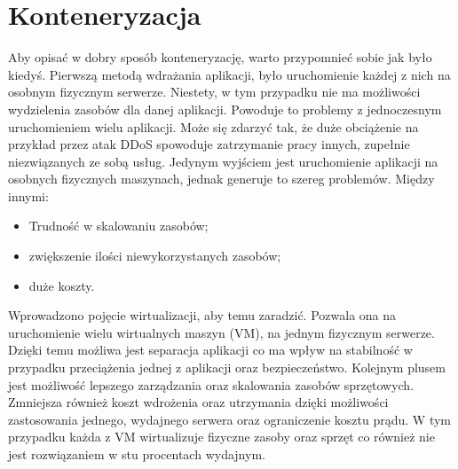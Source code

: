 \documentclass[pl,final,oneside]{mgr} %
\begin{document}
\section{Konteneryzacja}
Aby opisać w dobry sposób konteneryzację, warto przypomnieć sobie jak było kiedyś. Pierwszą metodą wdrażania aplikacji, było uruchomienie każdej z nich na osobnym fizycznym serwerze. Niestety, w tym przypadku nie ma możliwości wydzielenia zasobów dla danej aplikacji. Powoduje to problemy z jednoczesnym uruchomieniem wielu aplikacji. Może się zdarzyć tak, że duże obciążenie na przykład przez atak DDoS spowoduje zatrzymanie pracy innych, zupełnie niezwiązanych ze sobą usług. Jedynym wyjściem jest uruchomienie aplikacji na osobnych fizycznych maszynach, jednak generuje to szereg problemów. Między innymi:
\begin{itemize}
	\item Trudność w skalowaniu zasobów;
	\item zwiększenie ilości niewykorzystanych zasobów;
	\item duże koszty.
\end{itemize}
Wprowadzono pojęcie wirtualizacji, aby temu zaradzić. Pozwala ona na uruchomienie wielu wirtualnych maszyn (VM), na jednym fizycznym serwerze. Dzięki temu możliwa jest separacja aplikacji co ma wpływ na stabilność w przypadku przeciążenia jednej z aplikacji oraz bezpieczeństwo. Kolejnym plusem jest możliwość lepszego zarządzania oraz skalowania zasobów sprzętowych. Zmniejsza również koszt wdrożenia oraz utrzymania dzięki możliwości zastosowania jednego, wydajnego serwera oraz ograniczenie kosztu prądu. W tym przypadku każda z VM wirtualizuje fizyczne zasoby oraz sprzęt co również nie jest rozwiązaniem w stu procentach wydajnym.
\end{document}
